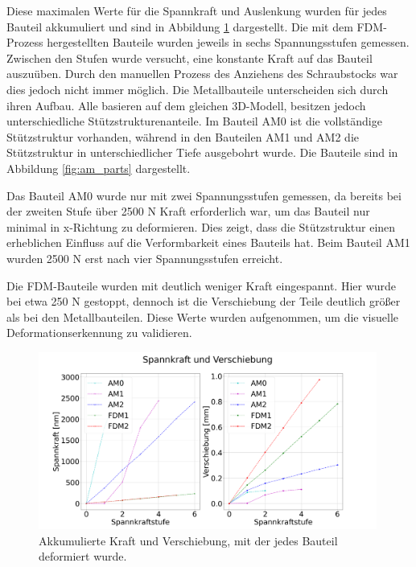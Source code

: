 Diese maximalen Werte für die Spannkraft und Auslenkung wurden für jedes Bauteil 
akkumuliert und sind in Abbildung \ref{fig:akkumulated} dargestellt. 
Die mit dem FDM-Prozess hergestellten Bauteile wurden jeweils in sechs Spannungsstufen
gemessen. Zwischen den Stufen wurde versucht, eine konstante Kraft auf das Bauteil 
auszuüben. Durch den manuellen Prozess des Anziehens des Schraubstocks war dies 
jedoch nicht immer möglich.
Die Metallbauteile unterscheiden sich durch ihren Aufbau. 
Alle basieren auf dem gleichen 3D-Modell, besitzen jedoch unterschiedliche 
Stützstrukturenanteile. Im Bauteil AM0 ist die vollständige Stützstruktur vorhanden,
während in den Bauteilen AM1 und AM2 die Stützstruktur in unterschiedlicher 
Tiefe ausgebohrt wurde. Die Bauteile sind in Abbildung \ref{fig:am_parts} dargestellt.

Das Bauteil AM0 wurde nur mit zwei Spannungsstufen gemessen, 
da bereits bei der zweiten Stufe über 2500 N Kraft erforderlich war, 
um das Bauteil nur minimal in x-Richtung zu deformieren. Dies zeigt, 
dass die Stützstruktur einen erheblichen Einfluss auf die Verformbarkeit 
eines Bauteils hat. Beim Bauteil AM1 wurden 2500 N erst nach vier Spannungsstufen 
erreicht.

 Die FDM-Bauteile wurden mit deutlich weniger Kraft eingespannt. 
 Hier wurde bei etwa 250 N gestoppt, dennoch ist die Verschiebung der 
 Teile deutlich größer als bei den Metallbauteilen. Diese Werte wurden aufgenommen, 
 um die visuelle Deformationserkennung zu validieren.

\begin{figure}[H]
    \centering
    \includegraphics[width=0.99\textwidth]{images/spannkraftstufen_akkumuliert.png}
    \caption{Akkumulierte Kraft und Verschiebung, mit der jedes Bauteil deformiert wurde.}
    \label{fig:akkumulated}
\end{figure}

